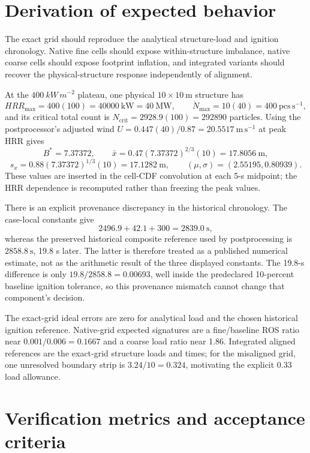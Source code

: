 \section{Derivation of expected behavior}
The exact grid should reproduce the analytical structure-load and ignition chronology. Native fine cells should expose within-structure imbalance, native coarse cells should expose footprint inflation, and integrated variants should recover the physical-structure response independently of alignment.

At the \(\SI{400}{kW\,m^{-2}}\) plateau, one physical
\(10\times10~\mathrm{m}\) structure has
\[
 HRR_{\max}=400(100)=40000~\mathrm{kW}=40~\mathrm{MW},
 \qquad \dot N_{\max}=10(40)=400~\mathrm{pcs\,s^{-1}},
\]
and its critical total count is
\(N_{\mathrm{crit}}=2928.9(100)=292890\) particles.
Using the postprocessor's adjusted wind
\(U=0.447(40)/0.87=20.5517~\mathrm{m\,s^{-1}}\) at peak HRR gives
\[
 B^*=7.37372,\qquad
 \bar x=0.47(7.37372)^{2/3}(10)=17.8056~\mathrm{m},
\]
\[
 s_x=0.88(7.37372)^{1/3}(10)=17.1282~\mathrm{m},\qquad
 (\mu,\sigma)=(2.55195,0.80939).
\]
These values are inserted in the cell-CDF convolution at each 5-s midpoint;
the HRR dependence is recomputed rather than freezing the peak values.

There is an explicit provenance discrepancy in the historical chronology.
The case-local constants give
\[
 2496.9+42.1+300=2839.0~\mathrm{s},
\]
whereas the preserved historical composite reference used by postprocessing
is \(2858.8~\mathrm{s}\), 19.8 s later.  The latter is therefore treated as
a published numerical estimate, not as the arithmetic result of the three
displayed constants.  The 19.8-s difference is only
\(19.8/2858.8=0.00693\), well inside the predeclared 10-percent baseline
ignition tolerance, so this provenance mismatch cannot change that component's
decision.

The exact-grid ideal errors are zero for analytical load and the chosen
historical ignition reference.  Native-grid expected signatures are a
fine/baseline ROS ratio near \(0.001/0.006=0.1667\) and a coarse load ratio
near 1.86.  Integrated aligned references are the exact-grid structure loads
and times; for the misaligned grid, one unresolved boundary strip is
\(3.24/10=0.324\), motivating the explicit 0.33 load allowance.

\section{Verification metrics and acceptance criteria}

